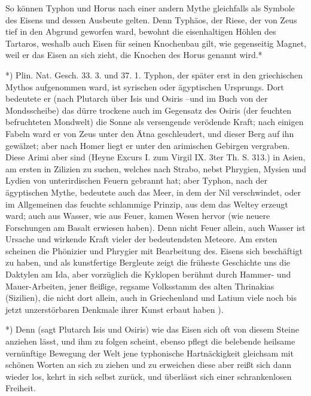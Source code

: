 \documentclass[a4paper, 11pt, oneside, polutonikogreek, german]{article}
\begin{document}
So können Typhon und Horus nach einer andern Mythe gleichfalls als Symbole des Eisens und dessen Ausbeute gelten. Denn Typhäos, der Riese, der von Zeus tief in den Abgrund geworfen ward, bewohnt die eisenhaltigen Höhlen des Tartaros, weshalb auch Eisen für seinen Knochenbau gilt, wie gegenseitig Magnet, weil er das Eisen an sich zieht, die Knochen des Horus genannt wird.*

*) Plin. Nat. Gesch. 33. 3. und 37. 1. Typhon, der später erst in den griechischen Mythos aufgenommen ward, ist syrischen oder ägyptischen Ursprungs. Dort bedeutete er (nach Plutarch über Isis und Osiris --und im Buch von der Mondsscheibe) das dürre trockene auch im Gegensatz des Osiris (der feuchten befruchteten Mondwelt) die Sonne als versengende verödende Kraft; nach einigen Fabeln ward er von Zeus unter den Ätna geschleudert, und dieser Berg auf ihn gewälzet; aber nach Homer liegt er unter den arimischen Gebirgen vergraben. Diese Arimi aber sind (Heyne Excurs I. zum Virgil IX. 3ter Th. S. 313.) in Asien, am ersten in Zilizien zu suchen, welches nach Strabo, nebst Phrygien, Mysien und Lydien von unterirdischen Feuern gebrannt hat; aber Typhon, nach der ägyptischen Mythe, bedeutete auch das Meer, in dem der Nil verschwindet, oder im Allgemeinen das feuchte schlammige Prinzip, aus dem das Weltey erzeugt ward; auch aus Wasser, wie aus Feuer, kamen Wesen hervor (wie neuere Forschungen am Basalt erwiesen haben). Denn nicht Feuer allein, auch Wasser ist Ursache und wirkende Kraft vieler der bedeutendsten Meteore. Am ersten scheinen die Phönizier und Phrygier mit Bearbeitung des. Eisens sich beschäftigt zu haben, und als kunstfertige Bergleute zeigt die früheste Geschichte uns die Daktylen am Ida, aber vorzüglich die Kyklopen berühmt durch Hammer- und Mauer-Arbeiten, jener fleißige, regsame Volksstamm des alten Thrinakias (Sizilien), die nicht dort allein, auch in Griechenland und Latium viele noch bis jetzt unzerstörbaren Denkmale ihrer Kunst erbaut haben ).

*) Denn (sagt Plutarch Isis und Osiris) wie das Eisen sich oft von diesem Steine anziehen lässt, und ihm zu folgen scheint, ebenso pflegt die belebende heilsame vernünftige Bewegung der Welt jene typhonische Hartnäckigkeit gleichsam mit schönen Worten an sich zu ziehen und zu erweichen diese aber reißt sich dann wieder los, kehrt in sich selbst zurück, und überlässt sich einer schrankenlosen Freiheit.
\end{document}
